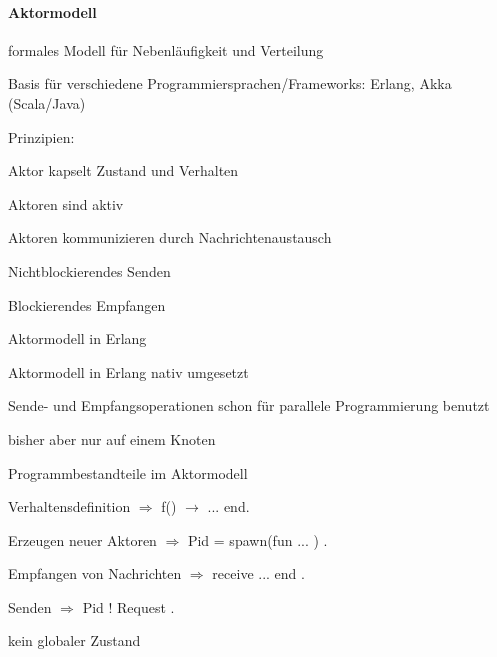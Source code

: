 \documentclass[10pt]{article}
\begin{document}
\paragraph{Aktormodell}
\begin{itemize*}
  \item formales Modell für Nebenläufigkeit und Verteilung
  \item Basis für verschiedene Programmiersprachen/Frameworks: Erlang, Akka (Scala/Java)
  \item Prinzipien:
  \begin{itemize*}
    \item Aktor kapselt Zustand und Verhalten
    \item Aktoren sind aktiv
    \item Aktoren kommunizieren durch Nachrichtenaustausch
    \begin{itemize*}
      \item Nichtblockierendes Senden
      \item Blockierendes Empfangen
    \end{itemize*}
  \end{itemize*}
\end{itemize*}

Aktormodell in Erlang
\begin{itemize*}
  \item Aktormodell in Erlang nativ umgesetzt
  \begin{itemize*}
    \item Sende- und Empfangsoperationen schon für parallele Programmierung benutzt
    \item bisher aber nur auf einem Knoten
  \end{itemize*}
  \item Programmbestandteile im Aktormodell
  \begin{itemize*}
    \item Verhaltensdefinition $\Rightarrow$ f() $\rightarrow$ ... end.
    \item Erzeugen neuer Aktoren $\Rightarrow$ Pid = spawn(fun ... ) .
    \item Empfangen von Nachrichten $\Rightarrow$ receive ... end .
    \item Senden $\Rightarrow$ Pid ! Request .
  \end{itemize*}
  \item kein globaler Zustand
\end{itemize*}
\end{document}
